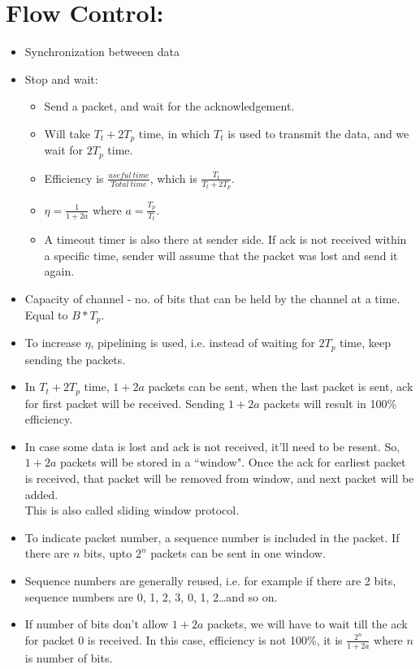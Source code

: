 \documentclass{article}
\begin{document}
\section{Flow Control:}
\begin{itemize}
	\item Synchronization betweeen data
	\item Stop and wait:\begin{itemize}
		\item Send a packet, and wait for the acknowledgement.
		\item Will take $T_t + 2T_p$ time, in which $T_t$ is used to transmit the data, and we wait for $2T_p$ time.
		\item Efficiency is $\frac{useful\ time}{Total\ time}$, which is $\frac{T_t}{T_t+2T_p}$.
		\item $\eta = \frac{1}{1+2a}$ where $a=\frac{T_p}{T_t}$.
		\item A timeout timer is also there at sender side. If ack is not received within a specific time, sender will assume that the packet was lost and send it again.
	\end{itemize}
	\item Capacity of channel - no. of bits that can be held by the channel at a time. Equal to $B*T_p$.
	\item To increase $\eta$, pipelining is used, i.e. instead of waiting for $2T_p$ time, keep sending the packets.
	\item In $T_t + 2T_p$ time, $1+2a$ packets can be sent, when the last packet is sent, ack for first packet will be received. Sending $1+2a$ packets will result in 100\% efficiency.
	\item In case some data is lost and ack is not received, it'll need to be resent. So, $1+2a$ packets will be stored in a ``window". Once the ack for earliest packet is received, that packet will be removed from window, and next packet will be added.
	\\This is also called sliding window protocol.
	\item To indicate packet number, a sequence number is included in the packet. If there are $n$ bits, upto $2^n$ packets can be sent in one window.
	\item Sequence numbers are generally reused, i.e. for example if there are 2 bits, sequence numbers are 0, 1, 2, 3, 0, 1, 2\dots and so on.
	\item If number of bits don't allow $1+2a$ packets, we will have to wait till the ack for packet 0 is received. In this case, efficiency is not 100\%, it is $\frac{2^n}{1+2a}$ where $n$ is number of bits.

\end{itemize}
\end{document}
